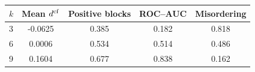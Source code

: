 \begin{tabular}{lcccc}
\toprule
$k$ & Mean $d^{\rm cf}$ & Positive blocks & ROC--AUC & Misordering \\
\midrule
3 & -0.0625 & 0.385 & 0.182 & 0.818 \\
6 & 0.0006 & 0.534 & 0.514 & 0.486 \\
9 & 0.1604 & 0.677 & 0.838 & 0.162 \\
\bottomrule
\end{tabular}
